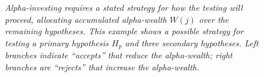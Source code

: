 \documentclass[12pt]{article}
\begin{document}
 \begin{figure}
\caption{\sl Alpha-investing requires a stated strategy for how the testing will
 proceed, allocating accumulated alpha-wealth $W(j)$ over the remaining
 hypotheses.  This example shows a possible strategy for testing a primary
 hypothesis $H_p$ and three secondary hypotheses. Left branches indicate
 ``accepts'' that reduce the alpha-wealth; right branches are ``rejects'' that
 increase the alpha-wealth.}
\label{fi:diagram}

 \begin{center}
  \ptbegtree
%
%  
%
  \ptbeg
    \ptbeg


       \ptbeg
       \ptend
   
       \ptbeg
       \ptbeg

          \ptbeg
          \ptend

          \ptbeg
          \ptend

       \ptend   
       \ptend

   \ptend
   \ptend
\ptendtree
\end{center}
\end{figure}
\end{document}
